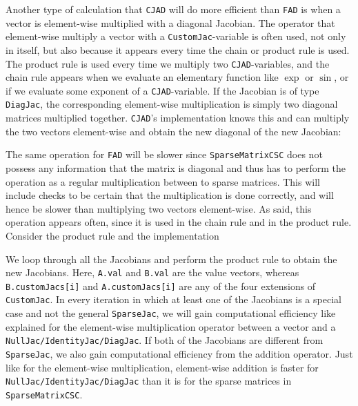 Another type of calculation that \texttt{CJAD} will do more efficient than \texttt{FAD} is when a vector is element-wise multiplied with a diagonal Jacobian. The operator that element-wise multiply a vector with a \texttt{CustomJac}-variable is often used, not only in itself, but also because it appears every time the chain or product rule is used. The product rule is used every time we multiply two \texttt{CJAD}-variables, and the chain rule appears when we evaluate an elementary function like $\exp$ or $\sin$, or if we evaluate some exponent of a \texttt{CJAD}-variable. If the Jacobian is of type \texttt{DiagJac}, the corresponding element-wise multiplication is simply two diagonal matrices multiplied together. \texttt{CJAD}'s implementation knows this and can multiply the two vectors element-wise and obtain the new diagonal of the new Jacobian:

The same operation for \texttt{FAD} will be slower since \texttt{SparseMatrixCSC} does not possess any information that the matrix is diagonal and thus has to perform the operation as a regular multiplication between to sparse matrices. This will include checks to be certain that the multiplication is done correctly, and will hence be slower than multiplying two vectors element-wise. As said, this operation appears often, since it is used in the chain rule and in the product rule. Consider the product rule and the implementation

We loop through all the Jacobians and perform the product rule to obtain the new Jacobians.  Here, \texttt{A.val} and \texttt{B.val} are the value vectors, whereas \texttt{B.customJacs[i]} and \texttt{A.customJacs[i]} are any of the four extensions of \texttt{CustomJac}. In every iteration in which at least one of the Jacobians is a special case and not the general \texttt{SparseJac}, we will gain computational efficiency like explained for the element-wise multiplication operator between a vector and a \texttt{NullJac/IdentityJac/DiagJac}. If both of the Jacobians are different from \texttt{SparseJac}, we also gain computational efficiency from the addition operator. Just like for the element-wise multiplication, element-wise addition is faster for \texttt{NullJac/IdentityJac/DiagJac} than it is for the sparse matrices in \texttt{SparseMatrixCSC}.


